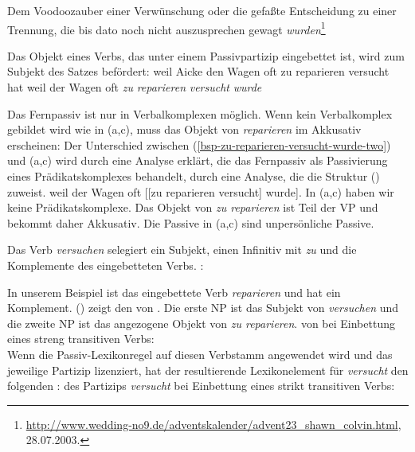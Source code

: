 \ex Dem Voodoozauber einer Verwünschung oder die gefaßte Entscheidung zu einer Trennung, die bis dato noch nicht auszusprechen gewagt \emph{wurden}\footnote{
        \url{http://www.wedding-no9.de/adventskalender/advent23_shawn_colvin.html}, 28.07.2003.
}

\zl
%

\noindent
Das Objekt eines Verbs, das unter einem Passivpartizip eingebettet ist, wird zum Subjekt des Satzes befördert:
\eal
\ex weil    Aicke den        Wagen oft   zu reparieren versucht hat
\ex weil    der        Wagen oft   \emph{zu} \emph{reparieren} \emph{versucht} \emph{wurde}
\label{bsp-zu-reparieren-versucht-wurde-two}
\zl

\noindent
Das Fernpassiv ist nur in Verbalkomplexen möglich. Wenn kein Verbalkomplex gebildet wird wie in
(a,c), muss das Objekt von \emph{reparieren} im Akkusativ erscheinen:
\eal
{}
\zl
Der Unterschied zwischen (\ref{bsp-zu-reparieren-versucht-wurde-two}) und (a,c) wird durch eine Analyse erklärt, die das Fernpassiv als Passivierung
eines Prädikatskomplexes behandelt, \dash durch eine Analyse, die  die Struktur () zuweist.
\ea
weil    der        Wagen oft   [[zu reparieren versucht] wurde].
\label{bsp-zu-reparieren-versucht-wurde-three}
%
\z
In (a,c) haben wir keine Prädikatskomplexe. Das Objekt von \emph{zu reparieren} ist Teil der VP
und bekommt daher Akkusativ. Die Passive in (a,c) sind unpersönliche Passive.

Das Verb \emph{versuchen} selegiert ein Subjekt, einen Infinitiv mit \emph{zu} und die
Komplemente des eingebetteten Verbs.
\ea
{}:\\
\z

\noindent
In unserem Beispiel ist das eingebettete Verb \emph{reparieren} und hat ein Komplement. () zeigt den
\argstw von . Die erste NP ist das Subjekt von \emph{versuchen} und die zweite NP ist das
angezogene Objekt von \emph{zu reparieren}.
\ea
\argstw von  bei Einbettung eines streng transitiven Verbs:\\
\z
Wenn die Passiv-Lexikonregel auf diesen Verbstamm angewendet wird und das jeweilige Partizip lizenziert, hat der
resultierende Lexikonelement für \emph{versucht} den folgenden \argstw:
\ea
\argst des Partizips \emph{versucht} bei Einbettung eines strikt transitiven Verbs:\\
\z

